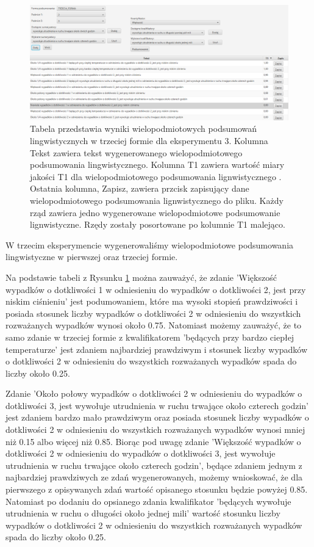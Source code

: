 \documentclass{classrep}
\begin{document}
\begin{figure}[h!]
 \centering
 \includegraphics[width=15cm]{ex_wiel3.png}
 \vspace{-0.3cm}
 \caption{Tabela przedstawia wyniki wielopodmiotowych podsumowań lingwistycznych w trzeciej formie dla eksperymentu 3. Kolumna Tekst zawiera tekst wygenerowanego wielopodmiotowego podsumowania lingwistycznego. Kolumna T1 zawiera wartość miary jakości T1 dla wielopodmiotowego podsumowania lignwistycznego \cite{niewiadomski19}. Ostatnia kolumna, Zapisz, zawiera przcisk zapisujący dane wielopodmiotowego podsumowania lignwistycznego do pliku. Każdy rząd zawiera jedno wygenerowane wielopodmiotowe podsumowanie lignwistyczne. Rzędy zostały posortowane po kolumnie T1 malejąco.  }
 \label{wykr_ex_wiel3}
\end{figure}

W trzecim eksperymencie wygenerowaliśmy wielopodmiotowe podsumowania lingwistyczne w pierwszej oraz trzeciej formie. 

Na podstawie tabeli z Rysunku \ref{wykr_ex_wiel3} można zauważyć, że zdanie 'Większość wypadków o dotkliwości 1 w odniesieniu do wypadków o dotkliwości 2, jest przy niskim ciśnieniu' jest podumowaniem, które ma wysoki stopień prawdziwości i posiada stosunek liczby wypadków o dotkliwości 2 w odniesieniu do wszystkich rozważanych wypadków wynosi około 0.75. Natomiast możemy zauważyć, że to samo zdanie w trzeciej formie z kwalifikatorem 'będących przy bardzo ciepłej temperaturze' jest zdaniem najbardziej prawdziwym i stosunek liczby wypadków o dotkliwości 2 w odniesieniu do wszystkich rozważanych wypadków spada do liczby około 0.25. 

Zdanie 'Około połowy wypadków o dotkliwości 2 w odniesieniu do wypadków o dotkliwości 3, jest wywołuje utrudnienia w ruchu trwające około czterech godzin' jest zdaniem bardzo mało prawdziwym oraz posiada stosunek liczby wypadków o dotkliwości 2 w odniesieniu do wszystkich rozważanych wypadków wynosi mniej niż 0.15 albo więcej niż 0.85.  Biorąc pod uwagę zdanie 'Większość wypadków o dotkliwości 2 w odniesieniu do wypadków o dotkliwości 3, jest wywołuje utrudnienia w ruchu trwające około czterech godzin', będące zdaniem jednym z najbardziej prawdziwych ze zdań wygenerowanych, możemy wnioskować, że dla pierwszego z opisywanych zdań wartość opisanego stosunku będzie powyżej 0.85. Natomiast po dodaniu do opsianego zdania kwalifikator 'będących wywołuje utrudnienia w ruchu o długości około jednej mili' wartość  stosunku liczby wypadków o dotkliwości 2 w odniesieniu do wszystkich rozważanych wypadków spada do liczby około 0.25. 
\end{document}
